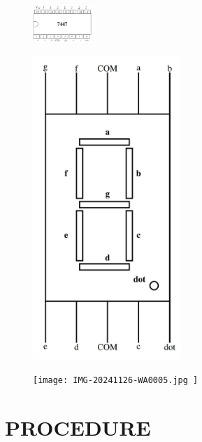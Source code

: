 \documentclass[conference]{IEEEtran}
\begin{document}
\begin{figure}[h]                           
\centering                                 
\includegraphics[width=0.2\textwidth]{7447022.jpg}                                           
\caption{\label{fig-2:Gates}}               
\end{figure}
\begin{figure}[h]                           
\centering                            
\includegraphics[width=0.5\textwidth]{744703.jpg }                      
\caption{\label{fig-1:Gates}}           
\end{figure}

\begin{figure}[h]                           
\centering                                 
\texttt{[image: IMG-20241126-WA0005.jpg  ]}                                           
\caption{\label{fig-3:Gates}}               
\end{figure}

\section{PROCEDURE}
\end{document}
